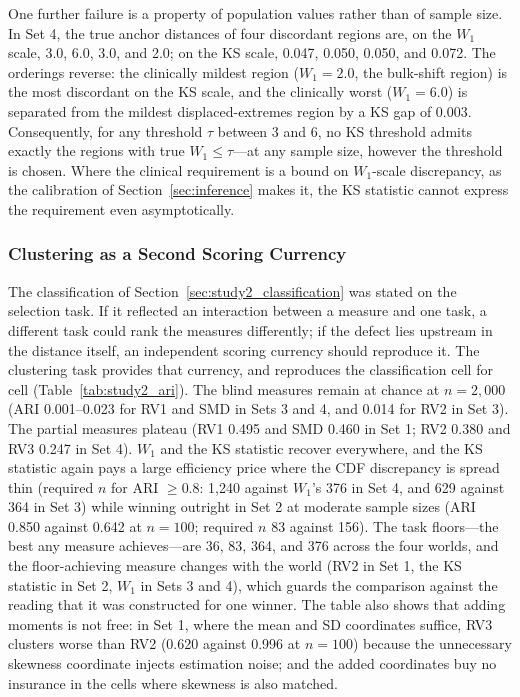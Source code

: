 \documentclass[AMA,Times1COL]{WileyNJDv5}
\begin{document}
One further failure is a property of population values rather than of sample size. In Set 4, the true anchor distances of four discordant regions are, on the $W_1$ scale, 3.0, 6.0, 3.0, and 2.0; on the KS scale, 0.047, 0.050, 0.050, and 0.072. The orderings reverse: the clinically mildest region ($W_1 = 2.0$, the bulk-shift region) is the most discordant on the KS scale, and the clinically worst ($W_1 = 6.0$) is separated from the mildest displaced-extremes region by a KS gap of 0.003. Consequently, for any threshold $\tau$ between 3 and 6, no KS threshold admits exactly the regions with true $W_1 \leq \tau$---at any sample size, however the threshold is chosen. Where the clinical requirement is a bound on $W_1$-scale discrepancy, as the calibration of Section~\ref{sec:inference} makes it, the KS statistic cannot express the requirement even asymptotically.

\subsubsection{Clustering as a Second Scoring Currency}\label{sec:study2_clustering}

The classification of Section~\ref{sec:study2_classification} was stated on the selection task. If it reflected an interaction between a measure and one task, a different task could rank the measures differently; if the defect lies upstream in the distance itself, an independent scoring currency should reproduce it. The clustering task provides that currency, and reproduces the classification cell for cell (Table~\ref{tab:study2_ari}). The blind measures remain at chance at $n = 2{,}000$ (ARI 0.001--0.023 for RV1 and SMD in Sets 3 and 4, and 0.014 for RV2 in Set 3). The partial measures plateau (RV1 0.495 and SMD 0.460 in Set 1; RV2 0.380 and RV3 0.247 in Set 4). $W_1$ and the KS statistic recover everywhere, and the KS statistic again pays a large efficiency price where the CDF discrepancy is spread thin (required $n$ for ARI $\geq 0.8$: 1{,}240 against $W_1$'s 376 in Set 4, and 629 against 364 in Set 3) while winning outright in Set 2 at moderate sample sizes (ARI 0.850 against 0.642 at $n = 100$; required $n$ 83 against 156). The task floors---the best any measure achieves---are 36, 83, 364, and 376 across the four worlds, and the floor-achieving measure changes with the world (RV2 in Set 1, the KS statistic in Set 2, $W_1$ in Sets 3 and 4), which guards the comparison against the reading that it was constructed for one winner. The table also shows that adding moments is not free: in Set 1, where the mean and SD coordinates suffice, RV3 clusters worse than RV2 (0.620 against 0.996 at $n = 100$) because the unnecessary skewness coordinate injects estimation noise; and the added coordinates buy no insurance in the cells where skewness is also matched.
\end{document}
